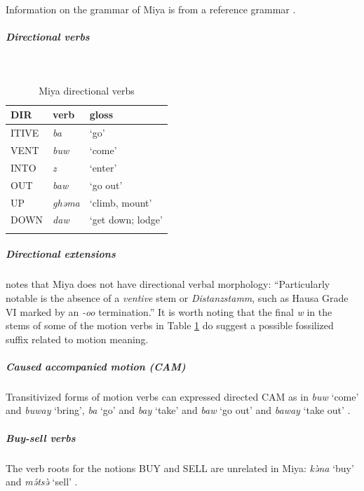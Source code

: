 Information on the grammar of Miya is from a reference grammar \citep{schuhGrammarMiya1998}. 

\subparagraph{Directional verbs}~



\begin{table}[H]
	\caption{Miya directional verbs} 
	\label{tab:miyaV}
	\begin{tabular}{lll} %
		\lsptoprule
		DIR & verb & gloss   \\ %
		\midrule
		ITIVE & \textit{ba} & `go' \\
		VENT & \textit{buw} & `come' \\
		INTO& \textit{z} & `enter' \\
		OUT & \textit{baw} & `go out' \\
		UP & \textit{ghəma} & `climb, mount' \\
		DOWN & \textit{daw} & `get down; lodge' \\
		\lspbottomrule
	\end{tabular}
\end{table}

\subparagraph{Directional extensions}



\citet[169]{schuhGrammarMiya1998} notes that Miya does not have directional verbal morphology: ``Particularly notable is the absence of a \textit{ventive} stem or \textit{Distanzstamm}, such as Hausa Grade VI marked by an \textit{-oo} termination.'' It is worth noting that the final \textit{w} in the stems of some of the motion verbs in Table \ref{tab:miyaV} do suggest a possible fossilized suffix related to motion meaning. 

\subparagraph{Caused accompanied motion (CAM)}



Transitivized forms of motion verbs can expressed directed CAM as in \textit{buw} `come' and \textit{buway} `bring', \textit{ba} `go' and \textit{bay} `take' and \textit{baw} `go out' and \textit{baway} `take out' \citep[178]{schuhGrammarMiya1998}.

\subparagraph{Buy-sell verbs}



The verb roots for the notions BUY and SELL are unrelated in Miya: \textit{kə̀na} `buy' and \textit{mə́tsə̀} `sell' \citep[169]{schuhGrammarMiya1998}.

